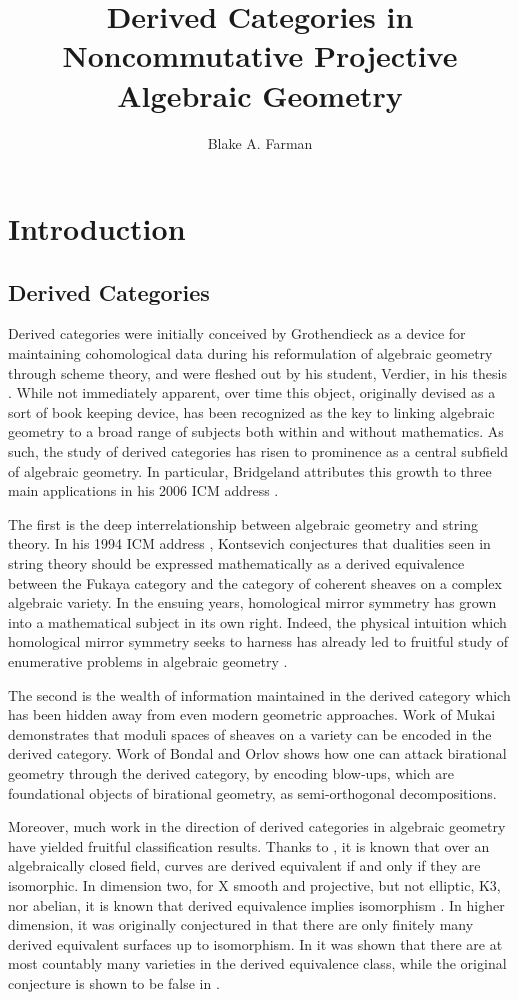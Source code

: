 \documentclass[12pt]{amsart}
\title{Derived Categories in Noncommutative Projective Algebraic Geometry}
\author{Blake A. Farman}
\theoremstyle{definition}
\begin{document}
\maketitle

\section*{Introduction}
\subsection*{Derived Categories}
Derived categories were initially conceived by Grothendieck as a device for maintaining cohomological data during his reformulation of algebraic geometry through scheme theory, and were fleshed out by his student, Verdier, in his thesis \cite{Verdier}.
While not immediately apparent, over time this object, originally devised as a sort of book keeping device, has been recognized as the key to linking algebraic geometry to a broad range of subjects both within and without mathematics.
As such, the study of derived categories has risen to prominence as a central subfield of algebraic geometry.
In particular, Bridgeland attributes this growth to three main applications in his 2006 ICM address \cite{Bridgeland06}.

The first is the deep interrelationship between algebraic geometry and string theory.
In his 1994 ICM address \cite{Kontsevich}, Kontsevich conjectures that dualities seen in string theory should be expressed mathematically as a derived equivalence between the Fukaya category and the category of coherent sheaves on a complex algebraic variety.
In the ensuing years, homological mirror symmetry has grown into a mathematical subject in its own right.
Indeed, the physical intuition which homological mirror symmetry seeks to harness has already led to fruitful study of enumerative problems in algebraic geometry \cite{enumerative}.

The second is the wealth of information maintained in the derived category which has been hidden away from even modern geometric approaches.
Work of Mukai \cite{Mukai81,Mukai87} demonstrates that moduli spaces of sheaves on a variety can be encoded in the derived category.
Work of Bondal and Orlov \cite{Bondal-Orlov} shows how one can attack birational geometry through the derived category, by encoding blow-ups, which are foundational objects of birational geometry, as semi-orthogonal decompositions.

Moreover, much work in the direction of derived categories in algebraic geometry have yielded fruitful classification results.
Thanks to \cite{Orlov1997}, it is known that over an algebraically closed field, curves are derived equivalent if and only if they are isomorphic.
In dimension two, for X smooth and projective, but not elliptic, K3, nor abelian, it is known that derived equivalence implies isomorphism \cite[Prop. 12.1]{HuyFMT}.
In higher dimension, it was originally conjectured in \cite{kawamata2002} that there are only finitely many derived equivalent surfaces up to isomorphism.
In \cite{AnToe} it was shown that there are at most countably many varieties in the derived equivalence class, while the original conjecture is shown to be false in \cite{lesieutre2014}.
\end{document}
